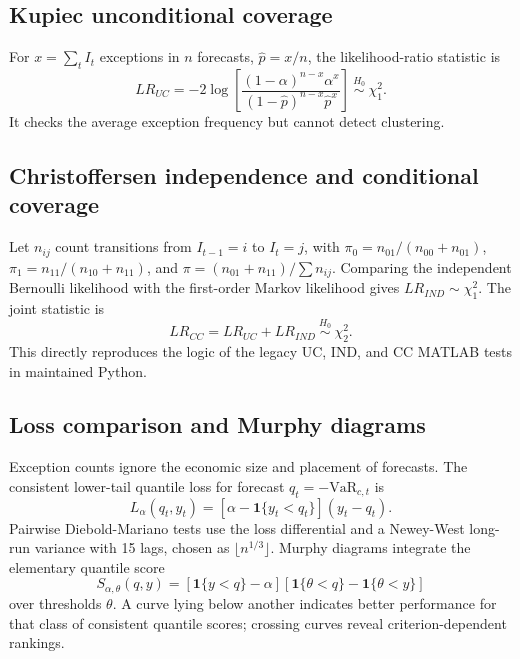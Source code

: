 \documentclass[11pt,a4paper]{article}
\begin{document}
\subsection{Kupiec unconditional coverage}

For $x=\sum_t I_t$ exceptions in $n$ forecasts, $\widehat p=x/n$, the likelihood-ratio statistic is
\begin{equation}
LR_{UC}=-2\log\left[
\frac{(1-\alpha)^{n-x}\alpha^x}
{(1-\widehat p)^{n-x}\widehat p^x}
\right]\ \overset{H_0}{\sim}\ \chi^2_1.
\end{equation}
It checks the average exception frequency but cannot detect clustering.

\subsection{Christoffersen independence and conditional coverage}

Let $n_{ij}$ count transitions from $I_{t-1}=i$ to $I_t=j$, with
$\pi_0=n_{01}/(n_{00}+n_{01})$, $\pi_1=n_{11}/(n_{10}+n_{11})$, and
$\pi=(n_{01}+n_{11})/\sum n_{ij}$. Comparing the independent Bernoulli likelihood with the
first-order Markov likelihood gives $LR_{IND}\sim\chi^2_1$. The joint statistic is
\begin{equation}
LR_{CC}=LR_{UC}+LR_{IND}\ \overset{H_0}{\sim}\ \chi^2_2.
\end{equation}
This directly reproduces the logic of the legacy UC, IND, and CC MATLAB tests in maintained Python.

\subsection{Loss comparison and Murphy diagrams}

Exception counts ignore the economic size and placement of forecasts. The consistent lower-tail
quantile loss for forecast $q_t=-\mathrm{VaR}_{c,t}$ is
\begin{equation}
L_{\alpha}(q_t,y_t)=\left[\alpha-\mathbf{1}\{y_t<q_t\}\right](y_t-q_t).
\end{equation}
Pairwise Diebold-Mariano tests use the loss differential and a Newey-West long-run variance with 15
lags, chosen as $\lfloor n^{1/3}\rfloor$. Murphy diagrams integrate the elementary quantile score
\begin{equation}
S_{\alpha,\theta}(q,y)=
\left[\mathbf{1}\{y<q\}-\alpha\right]
\left[\mathbf{1}\{\theta<q\}-\mathbf{1}\{\theta<y\}\right]
\end{equation}
over thresholds $\theta$. A curve lying below another indicates better performance for that class of
consistent quantile scores; crossing curves reveal criterion-dependent rankings.
\end{document}
